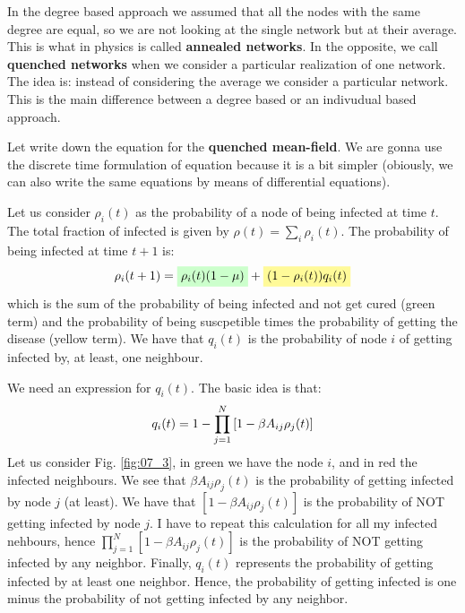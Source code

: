 \documentclass[../main/main.tex]{subfiles}
\begin{document}
In the degree based approach we assumed that all the nodes with the same degree are equal, so we are not looking at the single network but at their average. This is what in physics is called \textbf{annealed networks}.
In the opposite, we call \textbf{quenched networks} when we consider a particular realization of one network. The idea is: instead of considering the average we consider a particular network. This is the main difference between a degree based or an indivudual based approach.


Let write down the equation for the \textbf{quenched mean-field}. We are gonna use the discrete time formulation of equation because it is a bit simpler (obiously, we can also write the same equations by means of  differential equations).

Let us consider \( \rho _i (t) \) as the probability of a node of being infected at time \( t \). The total fraction of infected is given by \( \rho (t) = \sum_{i}^{} \rho _i (t)   \). The probability of being infected at time \( t+1 \) is:
\begin{equation}
  \rho _i (t+1) = \mathcolorbox{green!20}{\rho _i(t) (1- \mu )} + \mathcolorbox{yellow!40}{(1 - \rho _i(t))q_i(t)}
\end{equation}
which is the sum of the probability of being infected and not get cured (green term) and the probability of being suscpetible times the probability of getting the disease (yellow term).
We have that \( q_i(t) \) is the probability of node \( i \) of getting infected by, at least, one neighbour.

We need an expression for \( q_i(t) \). The basic idea is that:
\begin{equation}
  q_i (t) = 1 - \prod_{j=1}^{N} \qty[1- \beta A_{ij} \rho _j (t)]
\end{equation}
Let us consider Fig. \ref{fig:07_3}, in green we have the node \( i \), and in red the infected neighbours. We see that \( \beta A_{ij} \rho _j (t) \) is the probability of getting infected by node \( j \) (at least). We have that  \( [1- \beta A_{ij} \rho _j (t)] \) is the probability of NOT getting infected by node \( j \). I have to repeat this calculation for all my infected nehbours, hence \( \prod_{j=1}^{N} [1- \beta A_{ij} \rho _j (t)] \) is the probability of NOT getting infected by any neighbor.
Finally, \(   q_i (t) \) represents the probability of getting infected by at least one neighbor.
Hence, the probability of getting infected is one minus the probability of not getting infected by any neighbor.
\end{document}
